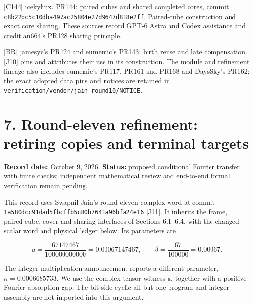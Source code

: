 \documentclass[
  11pt,
]{article}
\begin{document}
{[}C144{]} icekylinx.
\href{https://github.com/CrocSwap/integer-mult-bounds/pull/144}{PR144:
paired cubes and shared completed cores}, commit
\texttt{c8b22bc5c1\allowbreak{}0dba497ac2\allowbreak{}5804e27d96\allowbreak{}47d818e2ff}.
\href{https://github.com/icekylinx/integer-mult-bounds/blob/c8b22bc5c10dba497ac25804e27d9647d818e2ff/notes/paired-cube-construction.tex}{Paired-cube
construction} and
\href{https://github.com/icekylinx/integer-mult-bounds/blob/c8b22bc5c10dba497ac25804e27d9647d818e2ff/notes/paired-cube-sharing.tex}{exact
core sharing}. These sources record GPT-6 Astra and Codex assistance and
credit an664's PR128 sharing principle.

{[}BR{]} jamesyc's
\href{https://github.com/CrocSwap/integer-mult-bounds/pull/124}{PR124}
and eumemic's
\href{https://github.com/CrocSwap/integer-mult-bounds/pull/143}{PR143}:
birth reuse and late compensation. {[}J10{]} pins and attributes their
use in its construction. The module and refinement lineage also includes
eumemic's PR117, PR161 and PR168 and DaysSky's PR162; the exact adopted
data pins and notices are retained in
\texttt{verification/\allowbreak{}vendor/\allowbreak{}jain\_\allowbreak{}round10/\allowbreak{}NOTICE}.

\section{7. Round-eleven refinement: retiring copies and terminal
targets}\label{round-eleven-refinement-retiring-copies-and-terminal-targets}

\textbf{Record date:} October 9, 2026. \textbf{Status:} proposed
conditional Fourier transfer with finite checks; independent
mathematical review and end-to-end formal verification remain pending.

This record uses Swapnil Jain's round-eleven complex word at commit
\texttt{1a580dcc91\allowbreak{}dad5fbcffb\allowbreak{}5c80b7641a\allowbreak{}96bfa24e16} {[}J11{]}. It inherits
the frame, paired-cube, cover and sharing interfaces of Sections
6.1--6.4, with the changed scalar word and physical ledger below. Its
parameters are

\[
a=\frac{67147467}{100000000000}=0.00067147467,
\qquad \delta=\frac{67}{100000}=0.00067.
\tag{7.1}
\]

The integer-multiplication announcement reports a different parameter,
\(\kappa=0.0006685733\). We use the complex tensor witness \(a\),
together with a positive Fourier absorption gap. The bit-side cyclic
all-but-one program and integer assembly are not imported into this
argument.
\end{document}
